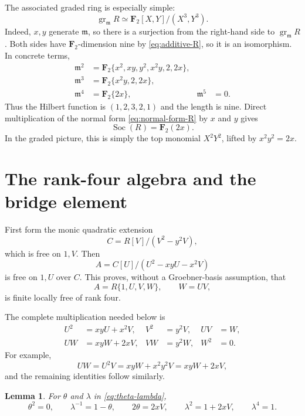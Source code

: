 \documentclass[11pt]{article}
\newtheorem{lemma}[theorem]{Lemma}
\theoremstyle{remark}
\newcommand{\F}{\mathbf F}
\newcommand{\Soc}{\operatorname{Soc}}
\newcommand{\gr}{\operatorname{gr}}
\newcommand{\m}{\mathfrak m}
\begin{document}
The associated graded ring is especially simple:
\begin{equation}\label{eq:grR}
 \gr_{\m}R\simeq\F_2[X,Y]/(X^3,Y^3).
\end{equation}
Indeed, $x,y$ generate $\m$, so there is a surjection from the right-hand
side to $\gr_{\m}R$.  Both sides have $\F_2$-dimension nine by
\eqref{eq:additive-R}, so it is an isomorphism.  In concrete terms,
\begin{align}
 \m^2&=\F_2\{x^2,xy,y^2,x^2y,2,2x\},\nonumber\\
 \m^3&=\F_2\{x^2y,2,2x\},\nonumber\\
 \m^4&=\F_2\{2x\},
 &\m^5&=0.\label{eq:m-powers}
\end{align}
Thus the Hilbert function is $(1,2,3,2,1)$ and the length is nine.  Direct
multiplication of the normal form \eqref{eq:normal-form-R} by $x$ and $y$
gives
\begin{equation}\label{eq:socle}
 \Soc(R)=\F_2(2x).
\end{equation}
In the graded picture, this is simply the top monomial
$X^2Y^2$, lifted by $x^2y^2=2x$.

\section{The rank-four algebra and the bridge element}

First form the monic quadratic extension
\[
 C=R[V]/(V^2-y^2V),
\]
which is free on $1,V$.  Then
\[
 A=C[U]/(U^2-xyU-x^2V)
\]
is free on $1,U$ over $C$.  This proves, without a Groebner-basis
assumption, that
\begin{equation}\label{eq:A-basis}
 A=R\{1,U,V,W\},\qquad W=UV,
\end{equation}
is finite locally free of rank four.

The complete multiplication needed below is
\begin{equation}\label{eq:A-multiplication}
\begin{aligned}
 U^2&=xyU+x^2V,& V^2&=y^2V,& UV&=W,\\
 UW&=xyW+2xV,& VW&=y^2W,& W^2&=0.
\end{aligned}
\end{equation}
For example,
\[
 UW=U^2V=xyW+x^2y^2V=xyW+2xV,
\]
and the remaining identities follow similarly.

\begin{lemma}\label{lem:theta}
For $\theta$ and $\lambda$ in \eqref{eq:theta-lambda},
\begin{equation}\label{eq:theta-identities}
 \theta^2=0,
 \qquad \lambda^{-1}=1-\theta,
 \qquad 2\theta=2xV,
 \qquad \lambda^2=1+2xV,
 \qquad \lambda^4=1.
\end{equation}
\end{lemma}
\end{document}

